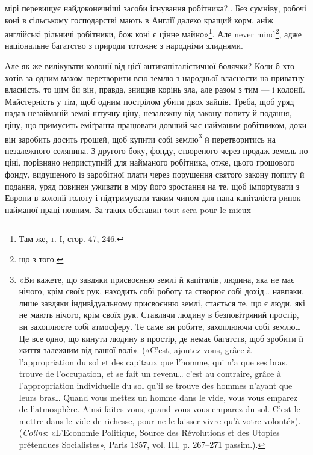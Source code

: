 \parcont{}  %
мірі перевищує найдоконечніші засоби існування робітника?.. Без сумніву, робочі коні в сільському
господарстві мають в Англії далеко кращий корм, аніж англійські рільничі робітники, бож коні є цінне
майно»\footnote{
Там же, т. І, стор. 47, 246.
}. Але never mind\footnote*{що з того. }, адже національне багатство з природи тотожнє з народніми злиднями.

Але як же вилікувати колонії від цієї антикапіталістичної болячки? Коли б хто хотів за одним махом
перетворити всю землю з народньої власности на приватну власність, то цим би він, правда, знищив
корінь зла, але разом з тим — і колонії. Майстерність у тім, щоб одним пострілом убити двох зайців.
Треба, щоб уряд надав незайманій землі штучну ціну, незалежну від закону попиту й подання, ціну, що
примусить еміґранта
працювати довший час найманим робітником, доки він заробить досить грошей, щоб купити собі землю\footnote{
«Ви кажете, що завдяки присвоєнню землі й капіталів, людина, яка не має нічого, крім своїх рук,
находить собі роботу та створює собі дохід\dots{} навпаки, лише завдяки індивідуальному присвоєнню
землі, стається те, що є люди, які не мають нічого, крім своїх рук. Ставлячи людину в безповітряний
простір, ви захоплюєте собі атмосферу. Те саме ви робите, захоплюючи собі землю\dots{} Це все одно, що
кинути людину в простір, де немає багатств, щоб зробити її життя залежним від вашої волі». («C’est,
ajoutez-vous, grâce à l’appropriation du sol et des capitaux que l’homme, qui n’a que ses bras,
trouve de l’occupation, et se fait un revenu\dots{} c’est au contraire, grâce à l’appropriation
individuelle du
sol qu’il se trouve des hommes n’ayant que leurs bras\dots{} Quand vous mettez un homme dans le vide,
vous vous emparez de l’atmosphère. Ainsi faites-vous, quand vous vous emparez du sol. C’est le
mettre dans le vide de richesse, pour ne le laisser vivre qu’à votre volonté»). (\emph{Colins}: «L’Economie
Politique, Source des Révolutions et des Utopies prétendues Socialistes», Paris 1857, vol. III, p.
267--271 passim.).
} й перетворитись на незалежного селянина. З другого боку, фонду, створеного через продаж земель по
ціні, порівняно неприступній для найманого робітника, отже, цього грошового фонду, видушеного із
заробітної плати через порушення святого закону попиту й подання, уряд повинен уживати в міру його
зростання на те, щоб імпортувати з Европи в колонії голоту і підтримувати таким
чином для пана капіталіста ринок найманої праці повним. За таких обставин tout sera pour le mieux
